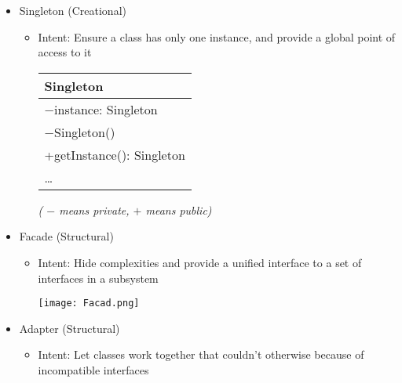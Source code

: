 \begin{itemize}
	\item Singleton (Creational)
	\begin{itemize}
		\item Intent: Ensure a class has only one instance, and provide a global point of access to it\\
		\begin{center}
			\begin{tabular}{| l |}
				\hline
				Singleton\\
				\hline
				$ - $instance: Singleton\\
				\hline
				$ - $Singleton()\\
				+getInstance(): Singleton\\
				\ldots\\
				\hline
			\end{tabular}	\textit{	( $ - $ means private, $ + $ means public)}
		\end{center}
	\end{itemize}
	\item Facade (Structural)
	\begin{itemize}
		\item Intent: Hide complexities and provide a unified interface to a set of interfaces in a subsystem\\[-10pt]
		\begin{center}
			\texttt{[image: Facad.png]}
		\end{center}
	\end{itemize}
	\item Adapter (Structural)
	\begin{itemize}
		\item Intent: Let classes work together that couldn't otherwise because of incompatible interfaces\\[-10pt]
		\begin{figure}[h!]
			\centering
\end{figure}
\end{itemize}
\end{itemize}
